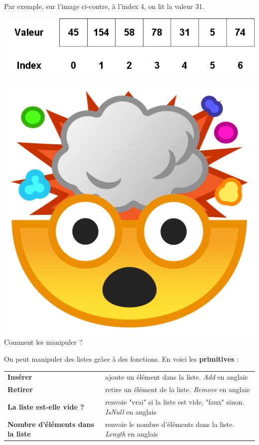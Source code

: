 \begin{minipage}{0.45\linewidth}
    Par exemple, sur l'image ci-contre, à l'index 4, on lit la valeur 31. 
\end{minipage}\begin{minipage}{0.49\linewidth}
    \begin{center}
        \includegraphics*[width=\linewidth]{Thème 1 – Structures de données/Chapitre 1 - Interface et implémentation/BLOB/Tableau_une_dimension.png}
    \end{center}
\end{minipage}

\includegraphics[scale=0.03]{Common_blob/mindblow.png}{\selectfont
Comment les manipuler ?\\
}

On peut manipuler des listes grâce à des fonctions. En voici les \textbf{primitives} :\\

\noindent\begin{tabular}{l | l }
    \textbf{Insérer} & ajoute un élément dans la liste. \textit{Add} en anglais\\
    \textbf{Retirer} & retire un élément de la liste.   \textit{Remove} en anglais \\
    \textbf{La liste est-elle vide ?} & renvoie "vrai" si la liste est vide, "faux" sinon.   \textit{IsNull} en anglais\\
    \textbf{Nombre d'éléments dans la liste} & renvoie le nombre d'éléments dans la liste. \textit{Length} en anglais\\[0.5cm]
\end{tabular}

